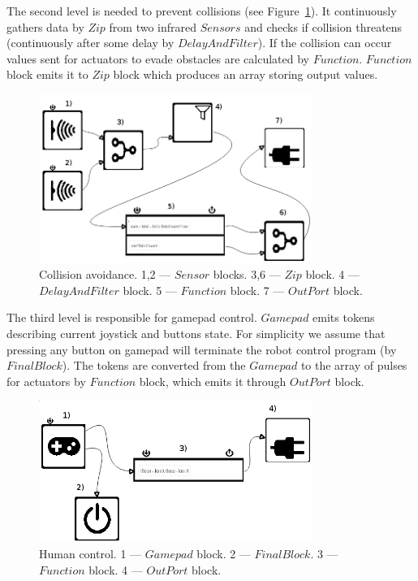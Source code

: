 \documentclass[conference,compsoc]{IEEEtran}
\begin{document}
The second level is needed to prevent collisions (see Figure~\ref{image:2l}). It continuously gathers data by $Zip$ from two infrared $Sensors$ and checks if collision threatens (continuously after some delay by $DelayAndFilter$). If the collision can occur values sent for actuators to evade obstacles are calculated by $Function$. $Function$ block emits it to $Zip$ block which produces an array storing output values.

\begin{figure}[ht]
	\centering
	\includegraphics[width=3.5in]{2l.png}
	\caption{Collision avoidance. 1,2 --- $Sensor$ blocks. 3,6 --- $Zip$ block. 4 --- $DelayAndFilter$ block. 5 --- $Function$ block. 7 --- $OutPort$ block.}
	\label{image:2l}
\end{figure}

The third level is responsible for gamepad control. $Gamepad$ emits tokens describing current joystick and buttons state. For simplicity we assume that pressing any button on gamepad will terminate the robot control program (by $FinalBlock$). The tokens are converted from the $Gamepad$ to the array of pulses for actuators by $Function$ block, which emits it through $OutPort$ block.

\begin{figure}[ht]
	\centering
	\includegraphics[width=3.5in]{3l.png}
	\caption{Human control. 1 --- $Gamepad$ block. 2 --- $FinalBlock$. 3 --- $Function$ block. 4 --- $OutPort$ block.}
	\label{image:3l}
\end{figure}
\end{document}
